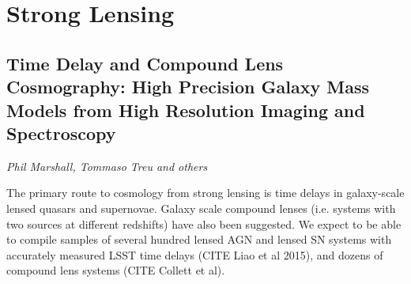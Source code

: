 
\section{Strong Lensing}
\label{sec:sl}


%
%


\subsection{Time Delay and Compound Lens Cosmography: High Precision Galaxy Mass Models from High Resolution Imaging and Spectroscopy}
{\it Phil Marshall, Tommaso Treu and others}

The primary route to cosmology from strong lensing is time delays in
galaxy-scale lensed quasars and supernovae. Galaxy scale compound lenses
(i.e. systems with two sources at different redshifts) have also been
suggested. We expect to be able to compile samples of several hundred lensed AGN
and lensed SN systems with accurately measured LSST time delays (CITE
Liao et al 2015), and dozens of compound lens systems (CITE Collett et al).

